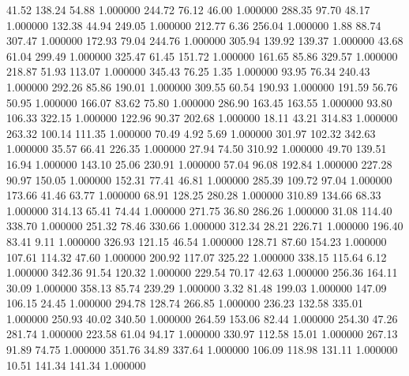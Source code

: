      41.52    138.24     54.88  1.000000
    244.72     76.12     46.00  1.000000
    288.35     97.70     48.17  1.000000
    132.38     44.94    249.05  1.000000
    212.77      6.36    256.04  1.000000
      1.88     88.74    307.47  1.000000
    172.93     79.04    244.76  1.000000
    305.94    139.92    139.37  1.000000
     43.68     61.04    299.49  1.000000
    325.47     61.45    151.72  1.000000
    161.65     85.86    329.57  1.000000
    218.87     51.93    113.07  1.000000
    345.43     76.25      1.35  1.000000
     93.95     76.34    240.43  1.000000
    292.26     85.86    190.01  1.000000
    309.55     60.54    190.93  1.000000
    191.59     56.76     50.95  1.000000
    166.07     83.62     75.80  1.000000
    286.90    163.45    163.55  1.000000
     93.80    106.33    322.15  1.000000
    122.96     90.37    202.68  1.000000
     18.11     43.21    314.83  1.000000
    263.32    100.14    111.35  1.000000
     70.49      4.92      5.69  1.000000
    301.97    102.32    342.63  1.000000
     35.57     66.41    226.35  1.000000
     27.94     74.50    310.92  1.000000
     49.70    139.51     16.94  1.000000
    143.10     25.06    230.91  1.000000
     57.04     96.08    192.84  1.000000
    227.28     90.97    150.05  1.000000
    152.31     77.41     46.81  1.000000
    285.39    109.72     97.04  1.000000
    173.66     41.46     63.77  1.000000
     68.91    128.25    280.28  1.000000
    310.89    134.66     68.33  1.000000
    314.13     65.41     74.44  1.000000
    271.75     36.80    286.26  1.000000
     31.08    114.40    338.70  1.000000
    251.32     78.46    330.66  1.000000
    312.34     28.21    226.71  1.000000
    196.40     83.41      9.11  1.000000
    326.93    121.15     46.54  1.000000
    128.71     87.60    154.23  1.000000
    107.61    114.32     47.60  1.000000
    200.92    117.07    325.22  1.000000
    338.15    115.64      6.12  1.000000
    342.36     91.54    120.32  1.000000
    229.54     70.17     42.63  1.000000
    256.36    164.11     30.09  1.000000
    358.13     85.74    239.29  1.000000
      3.32     81.48    199.03  1.000000
    147.09    106.15     24.45  1.000000
    294.78    128.74    266.85  1.000000
    236.23    132.58    335.01  1.000000
    250.93     40.02    340.50  1.000000
    264.59    153.06     82.44  1.000000
    254.30     47.26    281.74  1.000000
    223.58     61.04     94.17  1.000000
    330.97    112.58     15.01  1.000000
    267.13     91.89     74.75  1.000000
    351.76     34.89    337.64  1.000000
    106.09    118.98    131.11  1.000000
     10.51    141.34    141.34  1.000000
